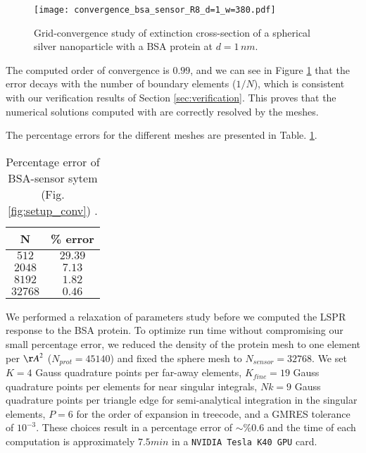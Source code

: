 \begin{figure}[h] %
   \centering
   \texttt{[image: convergence\_bsa\_sensor\_R8\_d=1\_w=380.pdf]} 
   \caption{Grid-convergence study of extinction cross-section of a spherical silver
            nanoparticle with a BSA protein at $d=1 \, nm$.}
   \label{fig:error_sphere-bsa}
\end{figure}

The computed order of convergence is $0.99$, and we can see in 
Figure \ref{fig:error_sphere-bsa} that the error decays with the number
of boundary elements ($1/N$), which is consistent with our verification 
results of Section \ref{sec:verification}. This proves that the
numerical solutions computed with \pygbe are correctly resolved by the meshes.

The percentage errors for the different meshes are presented in Table. \ref{table:err_bsa_sensor}.

\begin{table}[h]
    \centering
    \caption{\label{table:err_bsa_sensor} Percentage error of BSA-sensor sytem (Fig.\ref{fig:setup_conv}) .} 
    \begin{tabular}{c c}
    \hline%
    N & \% error \\
    \hline%
     $512$ & $29.39$ \\
     $2048$ & $7.13$ \\
     $8192$ & $1.82$ \\
     $32768$ & $0.46$ \\
    \hline%
    \end{tabular}
\end{table}

We performed a relaxation of parameters study before we computed the LSPR 
response to the BSA protein. To optimize run time without compromising our small
percentage error, we reduced the density of the protein mesh to one element per
${\AA}^2$ ($N_{prot}=45140$) and fixed the sphere mesh to $N_{sensor}=32768$. We
set $K=4$ Gauss quadrature points per far-away elements, $K_{fine} = 19$ Gauss
quadrature points per elements for near singular integrals, $Nk = 9$ Gauss 
quadrature points per triangle edge for semi-analytical integration in the 
singular elements, $P=6$ for the order of expansion in treecode, and a GMRES 
tolerance of $10^{-3}$. These choices result in a percentage error of $\sim\%0.6$
and the time of each computation is approximately $7.5 min$ in a \texttt{NVIDIA Tesla K40 GPU}
card. 

